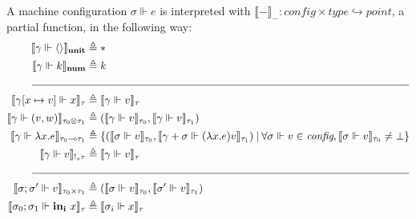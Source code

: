 \begin{definition}
  A machine configuration $\sigma \Vdash e$ is interpreted with $\llbracket -
  \rrbracket_{ - } : \textit{config} \times \textit{type} \hookrightarrow
  \textit{point}$, a partial function, in the following way:
  \begin{equation}
  \begin{aligned}[c]
  \llbracket \gamma \Vdash \langle \rangle \rrbracket_{\textbf{unit}}
    &\triangleq * \\
  \llbracket \gamma \Vdash k \rrbracket_{\textbf{num}} &\triangleq k \\
  \rule{5em}{0.4pt}&\rule{30em}{0.4pt}\\
  \llbracket \gamma [x \mapsto v] \Vdash x \rrbracket_{\tau} &\triangleq
    \llbracket \gamma \Vdash v \rrbracket_{\tau} \\
  \llbracket \gamma \Vdash (v, w) \rrbracket_{\tau_0 \otimes \tau_1} &\triangleq
    (\llbracket \gamma \Vdash v \rrbracket_{\tau_0}, \llbracket \gamma \Vdash v
    \rrbracket_{\tau_1}) \\
  \llbracket \gamma \Vdash \lambda x . e \rrbracket_{\tau_0 \multimap \tau_1}
    &\triangleq \{ (\llbracket \sigma \Vdash v \rrbracket_{\tau_0}, \llbracket
    \gamma + \sigma \Vdash (\lambda x . e) v \rrbracket_{\tau_1}) \> | \>
    \forall \sigma \Vdash v \in \textit{config}, \llbracket \sigma \Vdash v
    \rrbracket_{\tau_0} \not= \bot \} \\
  \llbracket \gamma \Vdash v \rrbracket_{!_s \tau} &\triangleq \llbracket \gamma
    \Vdash v \rrbracket_\tau \\
  \rule{5em}{0.4pt}&\rule{30em}{0.4pt}\\
  \llbracket \sigma; \sigma' \Vdash v \rrbracket_{\tau_0 \times \tau_1}
    &\triangleq (\llbracket \sigma \Vdash v \rrbracket_{\tau_0}, \llbracket
    \sigma' \Vdash v \rrbracket_{\tau_1}) \\
  \llbracket \sigma_0; \sigma_1 \Vdash \mathbf{in_i} \ x \rrbracket_{\tau}
    &\triangleq \llbracket \sigma_i \Vdash x \rrbracket_{\tau} \\

\end{aligned}
\end{equation}
\end{definition}
